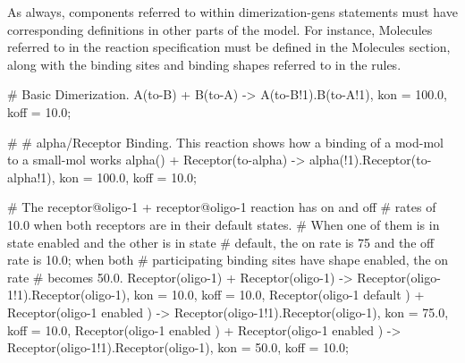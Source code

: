 As always, components referred to within dimerization-gens statements
must have corresponding definitions in other parts of the model.  For
instance, Molecules referred to in the reaction specification must be
defined in the Molecules section, along with the binding sites and binding
shapes referred to in the rules.  

\begin{ExampleMZR}

  # Basic Dimerization.
  A(to-B) + B(to-A) -> A(to-B!1).B(to-A!1),
       kon = 100.0,
       koff = 10.0;

    #
    # alpha/Receptor Binding.  This reaction shows how a binding of a
    mod-mol to a small-mol works
    alpha() + Receptor(to-alpha) -> alpha(!1).Receptor(to-alpha!1),
    	   kon = 100.0,
	   koff = 10.0;

    # The receptor@oligo-1 + receptor@oligo-1 reaction has on and off
    # rates of 10.0 when both receptors are in their default states.
    # When one of them is in state {enabled} and the other is in state
    # {default}, the on rate is 75 and the off rate is 10.0; when both
    # participating binding sites have shape {enabled}, the on rate
    # becomes 50.0.
    Receptor(oligo-1) + Receptor(oligo-1) -> Receptor(oligo-1!1).Receptor(oligo-1),
          kon = 10.0,
	  koff = 10.0,
       Receptor(oligo-1 { default} ) + Receptor(oligo-1 {enabled } )
         -> 
           Receptor(oligo-1!1).Receptor(oligo-1),
             kon = 75.0,
	     koff = 10.0,
       Receptor(oligo-1 { enabled } ) + Receptor(oligo-1 { enabled} ) 
         -> 
           Receptor(oligo-1!1).Receptor(oligo-1),
             kon = 50.0,
	     koff = 10.0;

\end{ExampleMZR}


